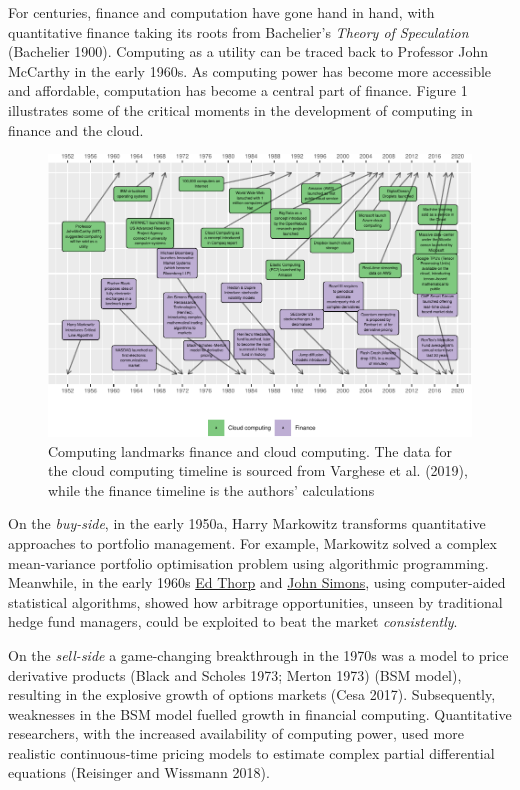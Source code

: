 \documentclass{article}
\begin{document}
For centuries, finance and computation have gone hand in hand, with
quantitative finance taking its roots from Bachelier's \emph{Theory of
Speculation} (Bachelier 1900). Computing as a utility can be traced back
to Professor John McCarthy in the early 1960s. As computing power has
become more accessible and affordable, computation has become a central
part of finance. Figure 1 illustrates some of the critical moments in
the development of computing in finance and the cloud.

\begin{figure}

{\centering \includegraphics[width=1\linewidth]{qrap_paper_files/figure-latex/timeline-1} 

}

\caption{ Computing landmarks finance and cloud computing.   The data for the cloud computing timeline is sourced from Varghese et al. (2019), while the finance timeline is the authors' calculations}\label{fig:timeline}
\end{figure}

On the \emph{buy-side}, in the early 1950a, Harry Markowitz transforms
quantitative approaches to portfolio management. For example, Markowitz
solved a complex mean-variance portfolio optimisation problem using
algorithmic programming. Meanwhile, in the early 1960s
\href{https://en.wikipedia.org/wiki/Edward_O._Thorp}{Ed Thorp} and
\href{https://en.wikipedia.org/wiki/Jim_Simons_(mathematician)}{John
Simons}, using computer-aided statistical algorithms, showed how
arbitrage opportunities, unseen by traditional hedge fund managers,
could be exploited to beat the market \emph{consistently}.

On the \emph{sell-side} a game-changing breakthrough in the 1970s was a
model to price derivative products (Black and Scholes 1973; Merton 1973)
(BSM model), resulting in the explosive growth of options markets (Cesa
2017). Subsequently, weaknesses in the BSM model fuelled growth in
financial computing. Quantitative researchers, with the increased
availability of computing power, used more realistic continuous-time
pricing models to estimate complex partial differential equations
(Reisinger and Wissmann 2018).
\end{document}

